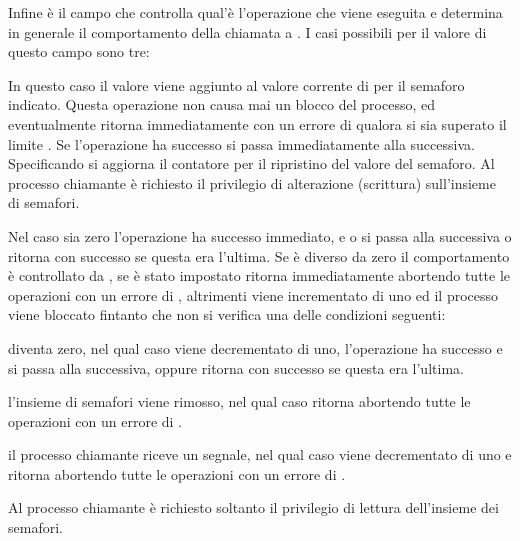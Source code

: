 Infine  è il campo che controlla qual'è l'operazione che viene
eseguita e determina in generale il comportamento della chiamata a
. I casi possibili per il valore di questo campo sono tre:
\begin{basedescript}{\desclabelwidth{1.8cm}}
\item[\var{sem\_op} $>0$] In questo caso il valore viene aggiunto al valore
  corrente di  per il semaforo indicato. Questa operazione non
  causa mai un blocco del processo, ed eventualmente  ritorna
  immediatamente con un errore di  qualora si sia superato il
  limite . Se l'operazione ha successo si passa immediatamente
  alla successiva.  Specificando  si aggiorna il contatore
  per il ripristino del valore del semaforo. Al processo chiamante è richiesto
  il privilegio di alterazione (scrittura) sull'insieme di semafori.
  
\item[\var{sem\_op} $=0$] Nel caso  sia zero l'operazione ha
  successo immediato, e o si passa alla successiva o  ritorna con
  successo se questa era l'ultima. Se  è diverso da zero il
  comportamento è controllato da , se è stato impostato
    ritorna immediatamente abortendo tutte le
  operazioni con un errore di , altrimenti viene incrementato
   di uno ed il processo viene bloccato fintanto che non si
  verifica una delle condizioni seguenti:
  \begin{itemize*}
  \item {} diventa zero, nel qual caso  viene
    decrementato di uno, l'operazione ha successo e si passa alla successiva,
    oppure  ritorna con successo se questa era l'ultima.
  \item l'insieme di semafori viene rimosso, nel qual caso 
    ritorna abortendo tutte le operazioni con un errore di .
  \item il processo chiamante riceve un segnale, nel qual caso 
    viene decrementato di uno e  ritorna abortendo tutte le
    operazioni con un errore di .
  \end{itemize*}
  Al processo chiamante è richiesto soltanto il privilegio di lettura
  dell'insieme dei semafori.
  

\end{basedescript}
